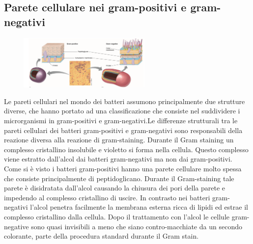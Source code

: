 \subsection{Parete cellulare nei gram-positivi e gram-negativi}
\begin{figure}
  \begin{center}
    \includegraphics[width=0.58\textwidth]{Pictures/3.png}
  \end{center}
\end{figure}
Le pareti cellulari nel mondo dei batteri assumono principalmente due strutture diverse, che hanno portato ad una classificazione che consiste nel 
suddividere i microrganismi in gram-positivi e gram-negativi.Le differenze strutturali tra le pareti cellulari dei batteri gram-positivi e gram-negativi sono responsabili della reazione diversa alla 
reazione di gram-staining. Durante il  Gram staining un complesso cristallino insolubile e violetto si forma nella cellula. Questo complesso viene estratto dall'alcol dai batteri gram-negativi ma non dai gram-positivi.
Come si \`e visto i batteri gram-positivi hanno una parete cellulare molto spessa che consiste principalmente di peptidoglicano. Durante il Gram-staining tale parete \`e disidratata dall'alcol causando la chiusura dei pori della parete e 
impedendo al complesso cristallino di uscire. In contrasto nei batteri gram-negativi l'alcol penetra facilmente la membrana esterna ricca di lipidi ed estrae il complesso cristallino dalla cellula. Dopo il trattamento con l'alcol le 
cellule gram-negative sono quasi invisibili a meno che siano contro-macchiate da un secondo colorante, parte della procedura standard durante il Gram stain.
